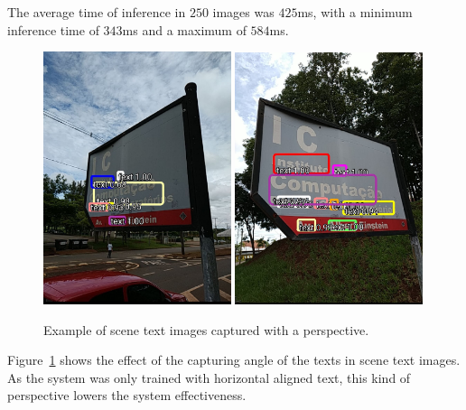  The average time of inference in $250$ images was $425$ms, with a minimum inference time of $343$ms and a maximum of $584$ms.


\begin{figure}[h!]
\centering
\includegraphics[width=0.49\textwidth]{Mobile/images/app27.jpg}
\includegraphics[width=0.49\textwidth]{Mobile/images/app28.jpg}

\caption{Example of scene text images captured with a perspective.}
\label{fig:ic-perspective}
\end{figure}
Figure~\ref{fig:ic-perspective} shows the effect of the capturing angle of the texts in scene text images. As the system was only trained with horizontal aligned text, this kind of perspective lowers the system effectiveness.


